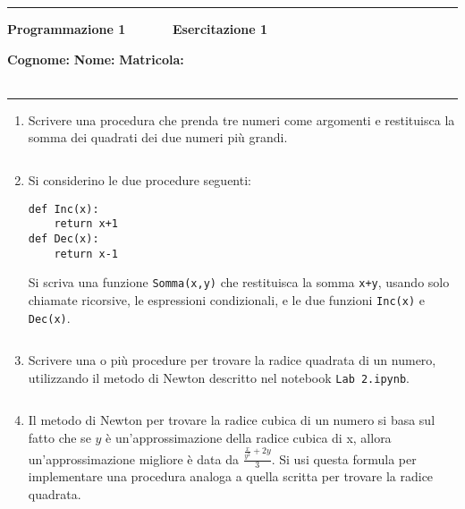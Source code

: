\documentclass[11pt,a4]{article}
\newcommand{\mybox}[2]{$\quad$\fbox{
\begin{minipage}{#1cm}
\hfill\vspace{#2cm}
\end{minipage}
}}
\begin{document}
\thispagestyle{empty}
\hrule
\begin{center}
   {\Large {\bf Programmazione 1 \hspace{3cm} $\quad \quad \quad$ Esercitazione 1}}
\end{center}
{\bf Cognome: }\hspace{2.5cm} {\bf Nome: } \hspace{2.5cm} {\bf Matricola: } \\\
\hrule

\begin{enumerate}
\section*{}

\item Scrivere una procedura che prenda tre numeri come argomenti 
e restituisca la somma dei quadrati dei due numeri più grandi.

\mybox{15}{3.5}

\item Si considerino le due procedure seguenti:

\begin{verbatim}
def Inc(x):
    return x+1
def Dec(x):
    return x-1
\end{verbatim}

Si scriva una funzione {\tt Somma(x,y)} che restituisca la somma {\tt x+y},
usando solo chiamate ricorsive, le espressioni condizionali, 
e le due funzioni {\tt Inc(x)} e {\tt Dec(x)}.

\mybox{15}{3.5}

\item Scrivere una o più procedure per trovare la radice quadrata di un numero, 
utilizzando il metodo di Newton descritto nel notebook {\tt Lab 2.ipynb}.

\mybox{15}{4.5}
 
\item Il metodo di Newton per trovare la radice cubica di un numero si basa sul fatto che se
$y$ è un'approssimazione della radice cubica di x, allora un'approssimazione migliore è data
da $\frac{\frac{x}{y^2} + 2y}{3}$.
Si usi questa formula per implementare una procedura analoga a quella scritta per trovare
la radice quadrata.


\end{enumerate}
\end{document}
